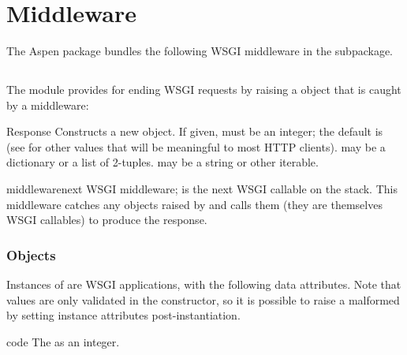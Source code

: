 \section{Middleware}

The Aspen package bundles the following WSGI middleware in the
 subpackage.


\subsection{}


The  module provides for ending WSGI requests by
raising a  object that is caught by a middleware:

\begin{classdesc}{Response}{  }
Constructs a new  object. If given,  must be an
integer; the default is
(see  for other values
that will be meaningful to most HTTP clients).  may be a dictionary
or a list of 2-tuples.  may be a string or other iterable.
\end{classdesc}

\begin{funcdesc}{middleware}{next}
WSGI middleware;  is the next WSGI callable on the stack. This
middleware catches any  objects raised by  and calls
them (they are themselves WSGI callables) to produce the response.
\end{funcdesc}


\subsubsection{ Objects}

Instances of  are WSGI applications,
with the following data attributes. Note that values are only validated in the
constructor, so it is possible to raise a malformed  by setting
instance attributes post-instantiation.

\begin{datadesc}{code}
The  as an integer.
\end{datadesc}

